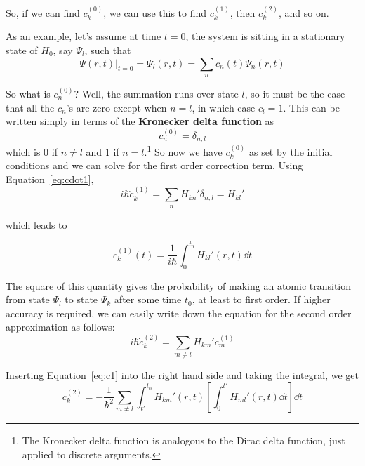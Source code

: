 So, if we can find $c_k^{(0)}$, we can use this to find $c_k^{(1)}$, then $c_k^{(2)}$, and so on. \par 

As an example, let's assume at time $t=0$, the system is sitting in a stationary state of $H_0$, say $\Psi_l$, such that
\begin{equation*}
	\Psi(r,t)|_{t=0} = \Psi_l(r,t) = \sum_n c_n(t) \Psi_n(r,t)
\end{equation*}

So what is $c_n^{(0)}$? Well, the summation runs over state $l$, so it must be the case that all the $c_n$'s are zero except when $n=l$, in which case $c_l=1$. This can be written simply in terms of the \textbf{Kronecker delta function} as
\begin{equation}
	c_n^{(0)} = \delta_{n,l}
\end{equation}
which is 0 if $n\neq l$ and 1 if $n=l$.\footnote{The Kronecker delta function is analogous to the Dirac delta function, just applied to discrete arguments.} So now we have $c_k^{(0)}$ as set by the initial conditions and we can solve for the first order correction term. Using Equation~\ref{eq:cdot1}, 
\begin{equation}
	i\hbar \dot{c}_k^{(1)} = \sum_n H_{kn}' \delta_{n,l} = H_{kl}'
\end{equation}

which leads to
\begin{tcolorbox}[title = First order perturbation coefficient] \vspace{-2ex}
	\begin{equation}
		c_k^{(1)}(t) = \frac{1}{i\hbar} \int_{0}^{t_0} H_{kl}'(r,t) \dd{t} \label{eq:c1}
	\end{equation}
\end{tcolorbox}

The square of this quantity gives the probability of making an atomic transition from state $\Psi_l$ to state $\Psi_k$ after some time $t_0$, at least to first order. If higher accuracy is required, we can easily write down the equation for the second order approximation as follows:
\begin{equation*}
	i\hbar \dot{c}_k^{(2)} = \sum_{m\neq l} H_{km}'c_m^{(1)}
\end{equation*}

Inserting Equation~\ref{eq:c1} into the right hand side and taking the integral, we get
\begin{equation}
	c_k^{(2)} = -\frac{1}{\hbar^2} \sum_{m\neq l} \int_{t'}^{t_0} H_{km}'(r,t) \left[ \int_{0}^{t'} H_{ml}'(r,t) \dd{t} \right] \dd{t}
\end{equation}

